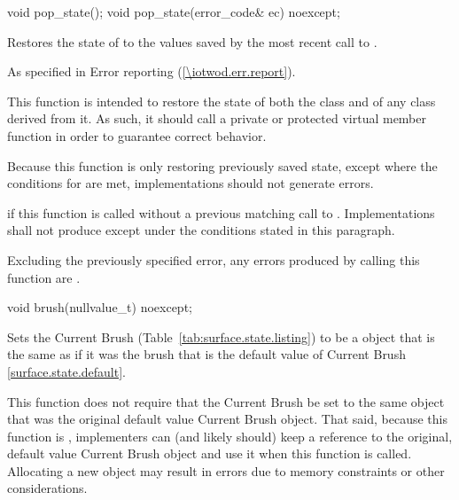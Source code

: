 \begin{itemdecl}
void pop_state();
void pop_state(error_code& ec) noexcept;
\end{itemdecl}
\begin{itemdescr}
\pnum
\effects
Restores the state of  to the values saved by the most recent call to .

\pnum
\throws
As specified in Error reporting (\ref{\iotwod.err.report}).


\pnum
\remarks
This function is intended to restore the state of both the  class and of any class derived from it. As such, it should call a private or protected virtual member function in order to guarantee correct behavior.

\pnum
Because this function is only restoring previously saved state, except where the conditions for  are met, implementations should not generate errors.

\pnum
\errors
{} if this function is called without a previous matching call to . Implementations shall not produce  except under the conditions stated in this paragraph.

\pnum
Excluding the previously specified error, any errors produced by calling this function are .
\end{itemdescr}

\begin{itemdecl}
void brush(nullvalue_t) noexcept;
\end{itemdecl}
\begin{itemdescr}
\pnum
\effects
Sets the Current Brush (Table~\ref{tab:surface.state.listing}) to be a  object that is the same as if it was the brush that is the default value of Current Brush \ref{surface.state.default}.

\pnum
\enternote
This function does not require that the Current Brush be set to the same  object that was the original default value Current Brush  object. That said, because this function is , implementers can (and likely should) keep a reference to the original, default value Current Brush  object and use it when this function is called. Allocating a new  object may result in errors due to memory constraints or other considerations.
\exitnote
\end{itemdescr}

